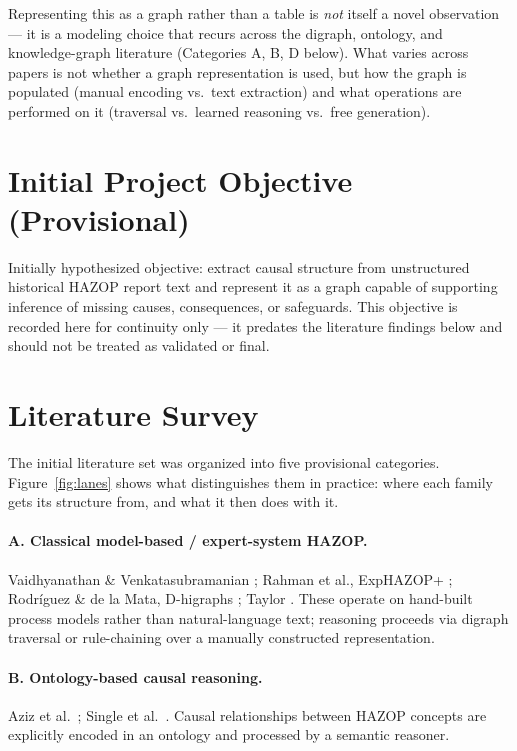 Representing this as a graph rather than a table is \emph{not} itself a novel observation --- it is a modeling choice that recurs across the digraph, ontology, and knowledge-graph literature (Categories A, B, D below). What varies across papers is not whether a graph representation is used, but how the graph is populated (manual encoding vs.\ text extraction) and what operations are performed on it (traversal vs.\ learned reasoning vs.\ free generation).

\section{Initial Project Objective (Provisional)}
Initially hypothesized objective: extract causal structure from unstructured historical HAZOP report text and represent it as a graph capable of supporting inference of missing causes, consequences, or safeguards. This objective is recorded here for continuity only --- it predates the literature findings below and should not be treated as validated or final.

\section{Literature Survey}
The initial literature set was organized into five provisional categories. Figure~\ref{fig:lanes} shows what distinguishes them in practice: where each family gets its structure from, and what it then does with it.

\paragraph{A. Classical model-based / expert-system HAZOP.}
Vaidhyanathan \& Venkatasubramanian \cite{vaidhyanathan1995digraph,vaidhyanathan1996experience}; Rahman et al., ExpHAZOP+ \cite{rahman2009exphazop}; Rodr{\'i}guez \& de la Mata, D-higraphs \cite{rodriguez2012dhigraphs}; Taylor \cite{taylor2017automated}. These operate on hand-built process models rather than natural-language text; reasoning proceeds via digraph traversal or rule-chaining over a manually constructed representation.

\paragraph{B. Ontology-based causal reasoning.}
Aziz et al.\ \cite{aziz2019ontology}; Single et al.\ \cite{single2020ontologyhazop}. Causal relationships between HAZOP concepts are explicitly encoded in an ontology and processed by a semantic reasoner.


